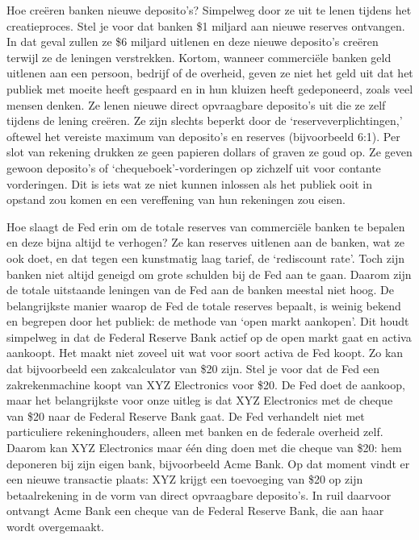 \documentclass[
  a5paper,
  smalldemyvopaper,10pt,twoside,onecolumn,openright,extrafontsizes,hidelinks]{memoir}
\begin{document}
Hoe creëren banken nieuwe deposito's? Simpelweg door ze uit te lenen
tijdens het creatieproces. Stel je voor dat banken \$1 miljard aan
nieuwe reserves ontvangen. In dat geval zullen ze \$6 miljard uitlenen
en deze nieuwe deposito's creëren terwijl ze de leningen verstrekken.
Kortom, wanneer commerciële banken geld uitlenen aan een persoon,
bedrijf of de overheid, geven ze niet het geld uit dat het publiek met
moeite heeft gespaard en in hun kluizen heeft gedeponeerd, zoals veel
mensen denken. Ze lenen nieuwe direct opvraagbare deposito's uit die ze
zelf tijdens de lening creëren. Ze zijn slechts beperkt door de
`reserveverplichtingen,' oftewel het vereiste maximum van deposito's en
reserves (bijvoorbeeld 6:1). Per slot van rekening drukken ze geen
papieren dollars of graven ze goud op. Ze geven gewoon deposito's of
`chequeboek'-vorderingen op zichzelf uit voor contante vorderingen. Dit
is iets wat ze niet kunnen inlossen als het publiek ooit in opstand zou
komen en een vereffening van hun rekeningen zou eisen.

Hoe slaagt de Fed erin om de totale reserves van commerciële banken te
bepalen en deze bijna altijd te verhogen? Ze kan reserves uitlenen aan
de banken, wat ze ook doet, en dat tegen een kunstmatig laag tarief, de
`rediscount rate'. Toch zijn banken niet altijd geneigd om grote
schulden bij de Fed aan te gaan. Daarom zijn de totale uitstaande
leningen van de Fed aan de banken meestal niet hoog. De belangrijkste
manier waarop de Fed de totale reserves bepaalt, is weinig bekend en
begrepen door het publiek: de methode van `open markt aankopen'. Dit
houdt simpelweg in dat de Federal Reserve Bank actief op de open markt
gaat en activa aankoopt. Het maakt niet zoveel uit wat voor soort activa
de Fed koopt. Zo kan dat bijvoorbeeld een zakcalculator van \$20 zijn.
Stel je voor dat de Fed een zakrekenmachine koopt van XYZ Electronics
voor \$20. De Fed doet de aankoop, maar het belangrijkste voor onze
uitleg is dat XYZ Electronics met de cheque van \$20 naar de Federal
Reserve Bank gaat. De Fed verhandelt niet met particuliere
rekeninghouders, alleen met banken en de federale overheid zelf. Daarom
kan XYZ Electronics maar één ding doen met die cheque van \$20: hem
deponeren bij zijn eigen bank, bijvoorbeeld Acme Bank. Op dat moment
vindt er een nieuwe transactie plaats: XYZ krijgt een toevoeging van
\$20 op zijn betaalrekening in de vorm van direct opvraagbare
deposito's. In ruil daarvoor ontvangt Acme Bank een cheque van de
Federal Reserve Bank, die aan haar wordt overgemaakt.
\end{document}
